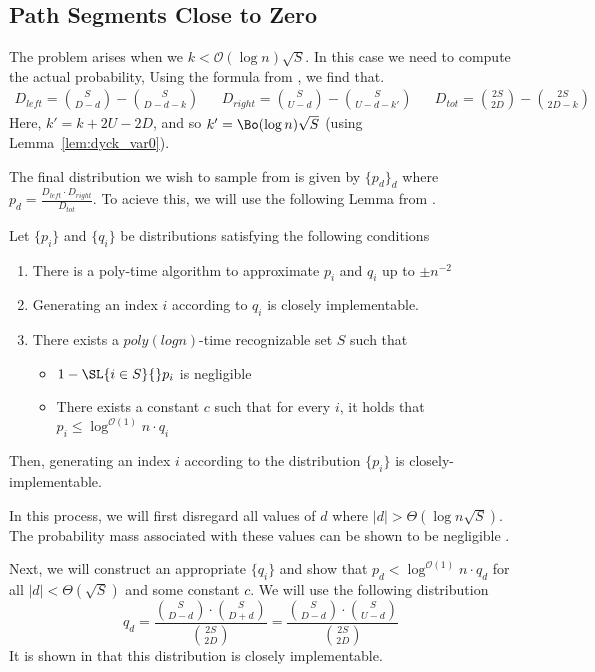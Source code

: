 \subsection{Path Segments Close to Zero}
The problem arises when we $k <\mathcal{O}(\log n)\sqrt{S}$. In this case we need to compute the actual probability,
Using the formula from \cite{trap}, we find that.
{\scriptsize
    \begin{align}
        D_{left} = {{S}\choose{D-d}}-{{S}\choose{D-d-k}}
        &&D_{right} = {{S}\choose{U-d}}-{{S}\choose{U-d-k'}}
        &&D_{tot} = {{2S}\choose{2D}}-{{2S}\choose{2D-k}}
    \end{align}
}
Here, $k' = k+2U-2D$, and so $k' = \Bo(\log n)\sqrt S$ (using Lemma~\ref{lem:dyck_var0}).

The final distribution we wish to sample from is given by $\{p_d\}_d$ where $p_d = \frac{D_{left}\cdot D_{right}}{D_{tot}}$.
To acieve this, we will use the following Lemma from \cite{huge}.
\begin{lemma}
\label{lem:huge}
Let $\{p_i\}$ and $\{q_i\}$ be distributions satisfying the following conditions
\begin{enumerate}
    \item There is a poly-time algorithm to approximate $p_i$ and $q_i$ up to $\pm n^{-2}$
    \item Generating an index $i$ according to $q_i$ is closely implementable.
    \item There exists a $poly(log n)$-time recognizable set $S$ such that
    \begin{itemize}
        \item $1-\SL{i\in S}{} p_i$ is negligible
        \item There exists a constant $c$ such that for every $i$, it holds that $p_i\le \log^{\mathcal{O}(1)} n\cdot q_i$
    \end{itemize}
\end{enumerate}
Then, generating an index $i$ according to the distribution $\{p_i\}$ is closely-implementable.
\end{lemma}

In this process, we will first disregard all values of $d$ where $|d|>\Theta(\log n\sqrt S)$.
The probability mass associated with these values can be shown to be negligible .

Next, we will construct an appropriate $\{q_i\}$ and show that $p_d < \log^{\mathcal{O}(1)} n\cdot q_d$
for all $|d|<\Theta(\sqrt S)$ and some constant $c$.
We will use the following distribution
$$
q_d = \frac{{S\choose D-d}\cdot{S\choose D+d}}{{2S\choose 2D}} = \frac{{S\choose D-d}\cdot{S\choose U-d}}{{2S\choose 2D}}
$$
It is shown in \cite{huge} that this distribution is closely implementable.

